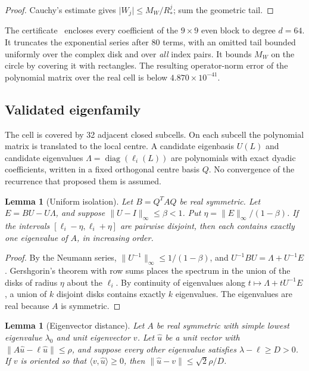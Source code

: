 \documentclass[11pt,a4paper]{article}
\newtheorem{lemma}[theorem]{Lemma}
\theoremstyle{definition}
\newcommand{\ip}[2]{\langle #1,#2\rangle}
\newcommand{\norm}[1]{\lVert #1\rVert}
\newcommand{\abs}[1]{\lvert #1\rvert}
\DeclareMathOperator{\diag}{diag}
\begin{document}
\begin{proof}
Cauchy's estimate gives $\abs{W_j}\le M_W/R_\ast^j$; sum the geometric tail.
\end{proof}

The certificate~\cite[artifact \texttt{weil\_support\_taylor\_17\_19\_8\_degree64}]{Artifacts}
encloses every coefficient of the $9\times9$ even block to degree $d=64$.
It truncates the exponential series after 80 terms, with an omitted tail
bounded uniformly over the complex disk and over \emph{all} index pairs. It
bounds $M_W$ on the circle by covering it with rectangles. The resulting
operator-norm error of the polynomial matrix over the real cell is
below $4.870\times10^{-41}$.

\subsection{Validated eigenfamily}
The cell is covered by 32 adjacent closed subcells. On each subcell the
polynomial matrix is translated to the local centre. A candidate eigenbasis
$U(L)$ and candidate eigenvalues $\Lambda=\diag(\ell_i(L))$ are polynomials
with exact dyadic coefficients, written in a fixed orthogonal centre basis
$Q$. No convergence of the recurrence that proposed them is assumed.

\begin{lemma}[Uniform isolation]\label{lem:isolation}
Let $B=Q^TAQ$ be real symmetric. Let $E=BU-U\Lambda$, and suppose
$\norm{U-I}_\infty\le\beta<1$. Put $\eta=\norm E_\infty/(1-\beta)$. If the
intervals $[\ell_i-\eta,\ell_i+\eta]$ are pairwise disjoint, then each
contains exactly one eigenvalue of $A$, in increasing order.
\end{lemma}

\begin{proof}
By the Neumann series, $\norm{U^{-1}}_\infty\le1/(1-\beta)$, and
$U^{-1}BU=\Lambda+U^{-1}E$. Gershgorin's theorem with row sums places the
spectrum in the union of the disks of radius $\eta$ about the $\ell_i$. By
continuity of eigenvalues along $t\mapsto\Lambda+tU^{-1}E$, a union of $k$
disjoint disks contains exactly $k$ eigenvalues. The eigenvalues are real
because $A$ is symmetric.
\end{proof}

\begin{lemma}[Eigenvector distance]\label{lem:distance}
Let $A$ be real symmetric with simple lowest eigenvalue $\lambda_0$ and unit
eigenvector $v$. Let $\hat u$ be a unit vector with
$\norm{A\hat u-\ell\hat u}\le\rho$, and suppose every other eigenvalue
satisfies $\lambda-\ell\ge D>0$. If $v$ is oriented so that
$\ip v{\hat u}\ge0$, then $\norm{\hat u-v}\le\sqrt2\rho/D$.
\end{lemma}
\end{document}
